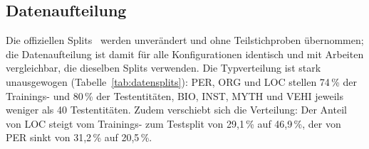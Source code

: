 \subsection{Datenaufteilung}
\label{sec:datenaufteilung}

Die offiziellen Splits~\cite{babelscape2023multinerdcard} werden
unverändert und ohne Teilstichproben übernommen; die Datenaufteilung ist
damit für alle Konfigurationen identisch und mit Arbeiten vergleichbar,
die dieselben Splits verwenden.
Die Typverteilung ist stark unausgewogen (Tabelle~\ref{tab:datensplits}):
PER, ORG und LOC stellen 74\,\% der Trainings- und 80\,\% der
Testentitäten, BIO, INST, MYTH und VEHI jeweils weniger als 40
Testentitäten.
Zudem verschiebt sich die Verteilung: Der Anteil von LOC steigt vom
Trainings- zum Testsplit von 29,1\,\% auf 46,9\,\%, der von PER sinkt
von 31,2\,\% auf 20,5\,\%.

